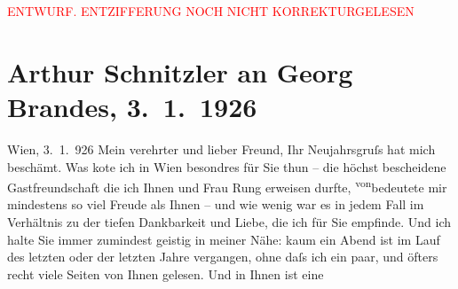 
\begin{center}
            \textcolor{red}{ENTWURF. ENTZIFFERUNG NOCH NICHT KORREKTURGELESEN}
                      \end{center}
            
               \section[Arthur Schnitzler an Georg Brandes, 3. 1. 1926]{ Arthur Schnitzler an Georg Brandes, 3. 1. 1926}\nopagebreak{}\rehead{ }\begin{ledgroupsized}[t]{13cm}\normalsize\beginnumbering{} \toendnotes[C]{\smallbreak\pagebreak[2]} 
\pstart
           \raggedleft{}{\pb}Wien, 3. 1. 926\pend
           \pstart{}Mein verehrter und lieber Freund,\pend\pstart
           Ihr Neujahrsgruſs hat mich beschämt. Was ko{\geminationn}te ich
                    in Wien besondres für Sie thun – die höchst
                    bescheidene Gastfreundschaft die ich Ihnen und Frau Rung erweisen durfte, \substVorne{}\textsuperscript{von}\substDazwischen{}bedeutete\substHinten{} mir mindestens so viel Freude als Ihnen – und wie wenig war es in jedem
                    Fall im Verhältnis zu der tiefen Dankbarkeit und Liebe, die ich für Sie
                    empfinde. Und ich halte Sie immer zumindest geistig in meiner Nähe: kaum ein
                    Abend ist im Lauf des letzten oder der letzten Jahre vergangen, ohne daſs ich
                    ein paar, und öfters recht viele Seiten von Ihnen gelesen. Und in Ihnen ist eine

\end{ledgroupsized}
